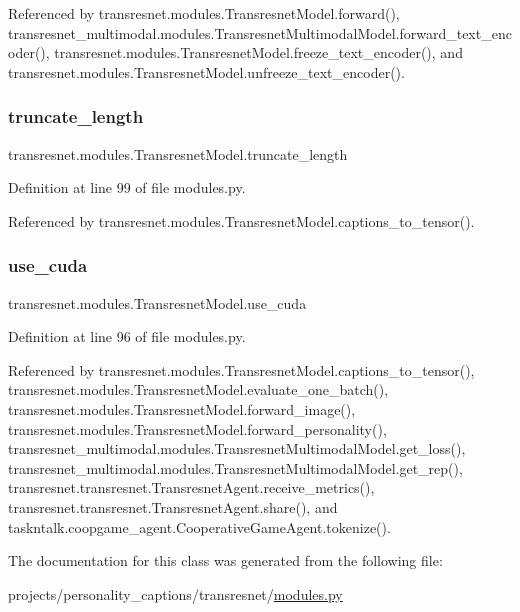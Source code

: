 Referenced by transresnet.\+modules.\+Transresnet\+Model.\+forward(), transresnet\+\_\+multimodal.\+modules.\+Transresnet\+Multimodal\+Model.\+forward\+\_\+text\+\_\+encoder(), transresnet.\+modules.\+Transresnet\+Model.\+freeze\+\_\+text\+\_\+encoder(), and transresnet.\+modules.\+Transresnet\+Model.\+unfreeze\+\_\+text\+\_\+encoder().

\mbox{\label{classtransresnet_1_1modules_1_1TransresnetModel_adb1828371e851d80247142fdbfe9ec6a}} 
\subsubsection{\texorpdfstring{truncate\+\_\+length}{truncate\_length}}
{\footnotesize\ttfamily transresnet.\+modules.\+Transresnet\+Model.\+truncate\+\_\+length}



Definition at line 99 of file modules.\+py.



Referenced by transresnet.\+modules.\+Transresnet\+Model.\+captions\+\_\+to\+\_\+tensor().

\mbox{\label{classtransresnet_1_1modules_1_1TransresnetModel_a16d44027020d2029b30bde80b86b9985}} 
\subsubsection{\texorpdfstring{use\+\_\+cuda}{use\_cuda}}
{\footnotesize\ttfamily transresnet.\+modules.\+Transresnet\+Model.\+use\+\_\+cuda}



Definition at line 96 of file modules.\+py.



Referenced by transresnet.\+modules.\+Transresnet\+Model.\+captions\+\_\+to\+\_\+tensor(), transresnet.\+modules.\+Transresnet\+Model.\+evaluate\+\_\+one\+\_\+batch(), transresnet.\+modules.\+Transresnet\+Model.\+forward\+\_\+image(), transresnet.\+modules.\+Transresnet\+Model.\+forward\+\_\+personality(), transresnet\+\_\+multimodal.\+modules.\+Transresnet\+Multimodal\+Model.\+get\+\_\+loss(), transresnet\+\_\+multimodal.\+modules.\+Transresnet\+Multimodal\+Model.\+get\+\_\+rep(), transresnet.\+transresnet.\+Transresnet\+Agent.\+receive\+\_\+metrics(), transresnet.\+transresnet.\+Transresnet\+Agent.\+share(), and taskntalk.\+coopgame\+\_\+agent.\+Cooperative\+Game\+Agent.\+tokenize().



The documentation for this class was generated from the following file\+:\begin{DoxyCompactItemize}
\item 
projects/personality\+\_\+captions/transresnet/\hyperlink{projects_2personality__captions_2transresnet_2modules_8py}{modules.\+py}\end{DoxyCompactItemize}
